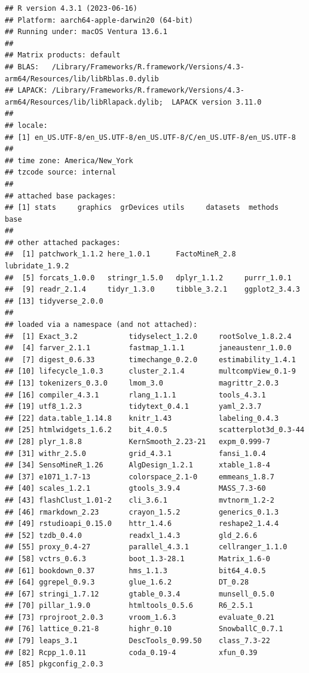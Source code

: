 \documentclass[
]{book}
\begin{document}
\begin{verbatim}
## R version 4.3.1 (2023-06-16)
## Platform: aarch64-apple-darwin20 (64-bit)
## Running under: macOS Ventura 13.6.1
## 
## Matrix products: default
## BLAS:   /Library/Frameworks/R.framework/Versions/4.3-arm64/Resources/lib/libRblas.0.dylib 
## LAPACK: /Library/Frameworks/R.framework/Versions/4.3-arm64/Resources/lib/libRlapack.dylib;  LAPACK version 3.11.0
## 
## locale:
## [1] en_US.UTF-8/en_US.UTF-8/en_US.UTF-8/C/en_US.UTF-8/en_US.UTF-8
## 
## time zone: America/New_York
## tzcode source: internal
## 
## attached base packages:
## [1] stats     graphics  grDevices utils     datasets  methods   base     
## 
## other attached packages:
##  [1] patchwork_1.1.2 here_1.0.1      FactoMineR_2.8  lubridate_1.9.2
##  [5] forcats_1.0.0   stringr_1.5.0   dplyr_1.1.2     purrr_1.0.1    
##  [9] readr_2.1.4     tidyr_1.3.0     tibble_3.2.1    ggplot2_3.4.3  
## [13] tidyverse_2.0.0
## 
## loaded via a namespace (and not attached):
##  [1] Exact_3.2            tidyselect_1.2.0     rootSolve_1.8.2.4   
##  [4] farver_2.1.1         fastmap_1.1.1        janeaustenr_1.0.0   
##  [7] digest_0.6.33        timechange_0.2.0     estimability_1.4.1  
## [10] lifecycle_1.0.3      cluster_2.1.4        multcompView_0.1-9  
## [13] tokenizers_0.3.0     lmom_3.0             magrittr_2.0.3      
## [16] compiler_4.3.1       rlang_1.1.1          tools_4.3.1         
## [19] utf8_1.2.3           tidytext_0.4.1       yaml_2.3.7          
## [22] data.table_1.14.8    knitr_1.43           labeling_0.4.3      
## [25] htmlwidgets_1.6.2    bit_4.0.5            scatterplot3d_0.3-44
## [28] plyr_1.8.8           KernSmooth_2.23-21   expm_0.999-7        
## [31] withr_2.5.0          grid_4.3.1           fansi_1.0.4         
## [34] SensoMineR_1.26      AlgDesign_1.2.1      xtable_1.8-4        
## [37] e1071_1.7-13         colorspace_2.1-0     emmeans_1.8.7       
## [40] scales_1.2.1         gtools_3.9.4         MASS_7.3-60         
## [43] flashClust_1.01-2    cli_3.6.1            mvtnorm_1.2-2       
## [46] rmarkdown_2.23       crayon_1.5.2         generics_0.1.3      
## [49] rstudioapi_0.15.0    httr_1.4.6           reshape2_1.4.4      
## [52] tzdb_0.4.0           readxl_1.4.3         gld_2.6.6           
## [55] proxy_0.4-27         parallel_4.3.1       cellranger_1.1.0    
## [58] vctrs_0.6.3          boot_1.3-28.1        Matrix_1.6-0        
## [61] bookdown_0.37        hms_1.1.3            bit64_4.0.5         
## [64] ggrepel_0.9.3        glue_1.6.2           DT_0.28             
## [67] stringi_1.7.12       gtable_0.3.4         munsell_0.5.0       
## [70] pillar_1.9.0         htmltools_0.5.6      R6_2.5.1            
## [73] rprojroot_2.0.3      vroom_1.6.3          evaluate_0.21       
## [76] lattice_0.21-8       highr_0.10           SnowballC_0.7.1     
## [79] leaps_3.1            DescTools_0.99.50    class_7.3-22        
## [82] Rcpp_1.0.11          coda_0.19-4          xfun_0.39           
## [85] pkgconfig_2.0.3
\end{verbatim}
\end{document}
